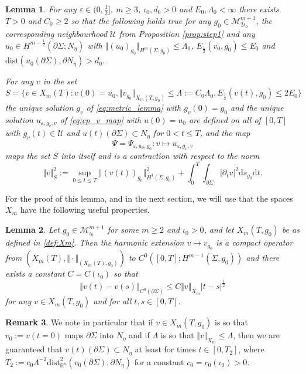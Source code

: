 \documentclass[10pt,reqno]{amsart}
\theoremstyle{plain}
\newtheorem{lemma}{Lemma}[section]
\theoremstyle{definition}
\newtheorem{rmk}[lemma]{Remark}
\numberwithin{equation}{section}
\newcommand{\La}{\Lambda}
\newcommand{\Si}{\Sigma}
\newcommand{\ep}{\varepsilon}
\newcommand{\R}{\ensuremath{{\mathbb R}}}
\newcommand{\norm}[1]{\Vert#1\Vert}
\newcommand{\beq}{\begin{equation}}
\newcommand{\eeq}{\end{equation}}
\newcommand{\beqs}{\begin{equation*}}
\newcommand{\eeqs}{\end{equation*}}
\newcommand{\half}{\frac{1}{2}}
\newcommand{\dd}{\mathrm{d}} %
\newcommand{\abs}[1]{\vert#1\vert}
\newcommand{\dist}{\text{dist}}
\newcommand{\pSi}{{\partial \Sigma}}
\newcommand{\MM}{\mathcal{M}} %
\newcommand{\UU}{{\mathcal U}}
\newcommand{\hf}{\frac{1}{2}} %
\newcommand{\p}{\partial} %
\newcommand{\MMiota}{\MM_{\iota_0}}
\newcommand{\MMtwoiota}{\MM_{2\iota_0}}
\begin{document}
\begin{lemma}\label{lemma:FPT}
    For any $\ep \in (0,\hf]$,  $m \geq 3$, $\iota_0,d_0>0$ and $E_0,\La_0<\infty$ there exists $T>0$ and $C_0\geq 2$ so that the following holds true for any $g_0\in \MMtwoiota^{m+1}$, the corresponding neighbourhood $\UU$ from Proposition \ref{prop:step1} and any $u_0\in H^{m-\hf}(\p\Si;N_\eta)$ with $\norm{(u_0)_{g_0}}_{H^m(\Si,g_0)}\leq \La_0$, $E_{\hf}(v_0,g_0)\leq E_0$ and $\dist(u_0(\pSi),\partial N_\eta)>d_0$. 
    
    For any $v$ in the set 
    \beqs%
        S=\{v\in X_m(T) :  v(0)=u_0, \norm{v_{g_0}}_{X_m(T,g_0)}\le\La:=C_0\La_0, E_{\hf}(v(t),g_0)\le 2E_0\}
    \eeqs
    the unique solution $g_v$ of \eqref{eq:metric_lemma} with $g_v(0)=g_0$ and the unique solution $u_{\ep,g_v,v}$ of \eqref{eq:ep_v_map} with $u(0)=u_0$ are defined on all of $[0,T]$ with $g_v(t)\in\UU$ and $u(t)(\pSi)\subset N_{\eta}$ for $0<t\le T$, and the map 
    $$\Psi=\Psi_{\ep,u_0,g_0}\colon v\mapsto u_{\ep,g_v,v}$$
    maps the set $S$ into itself and is a contraction with respect to the norm
    \begin{equation*}
        \norm{v}_S^2:=\sup\limits_{0\le t\le T}\norm{(v(t))_{g_0}}_{H^1(\Si,g_0)}^2 + \int_0^T\int_{\p\Si}\abs{\p_tv}^2\dd s_{g_0}\dd t.
    \end{equation*}
\end{lemma}
For the proof of this lemma, and in the next section, we will use that the spaces $X_m$ have the following useful properties.
\begin{lemma}\label{lemma:Xm}
    Let $g_0\in \MMiota^{m+1}$ for some $m\geq 2$ and $\iota_0>0$,  and let $X_m(T,g_0)$ be as defined in \eqref{def:Xm}. Then the harmonic extension $v\mapsto v_{g_0}$ is a compact operator from $(X_m(T),\norm{\cdot}_{(X_m(T),g_0)})$ to $C^{0}([0,T];H^{m-1}(\Si,g_0))$ and there exists a constant $C=C(\iota_0)$ so that
    \beq\label{est:C0-norm-bdry}
        \norm{v(t)-v(s)}_{C^0(\p \Si)}\leq C \norm{v}_{X_m}\abs{t-s}^\half
    \eeq
     for any $v\in X_m(T,g_0)$ and for all $t,s\in [0,T]$.
\end{lemma}

\begin{rmk}\label{rmk:v-in-Nde}
    We note in particular that if $v\in X_m(T,g_0)$ is so that $v_0:=v(t=0)$ maps $\p\Si$ into $N_\eta$ and if $\La$ is so that $\norm{v}_{X_m}\leq \La$, then we are guaranteed that $v(t)(\p \Si) \subset N_\eta$ at least for times $t\in [0,T_2]$, where $T_2:= c_0 \La^{-2} \dist_{\R^n}^2(v_0(\p\Si),\p N_\eta)$ for a constant $c_0=c_0(\iota_0)>0$.
\end{rmk}
\end{document}
